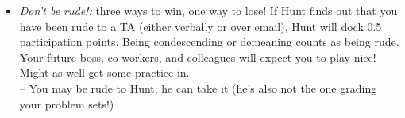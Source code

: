 \documentclass[11pt, a4paper]{article}
\begin{document}
\begin{itemize}
     \item \emph{Don't be rude!:} three ways to win, one way to lose! If Hunt finds out that you have been rude to a TA (either verbally or over email), Hunt will dock 0.5 participation points. Being condescending or demeaning counts as being rude. Your future boss, co-workers, and colleagues will expect you to play nice! Might as well get some practice in. \\ -- You may be rude to Hunt; he can take it (he's also not the one grading your problem sets!)
    
\end{itemize}












\end{document}
